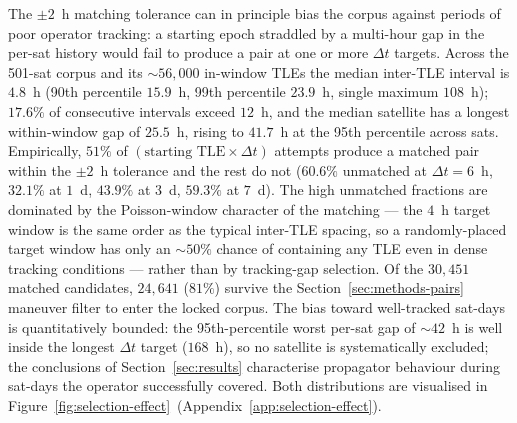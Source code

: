 \documentclass[10pt, letterpaper]{article}
\begin{document}
The $\pm 2$~h matching tolerance can in principle bias the corpus
against periods of poor operator tracking: a starting epoch
straddled by a multi-hour gap in the per-sat history would fail
to produce a pair at one or more $\Delta t$ targets. Across the
501-sat corpus and its $\sim 56{,}000$ in-window TLEs the median
inter-TLE interval is $4.8$~h (90th percentile $15.9$~h, 99th
percentile $23.9$~h, single maximum $108$~h); $17.6\%$ of
consecutive intervals exceed $12$~h, and the median satellite has
a longest within-window gap of $25.5$~h, rising to $41.7$~h at
the 95th percentile across sats. Empirically, $51\%$
of $(\text{starting~TLE} \times \Delta t)$ attempts produce a
matched pair within the $\pm 2$~h tolerance and the rest do not
($60.6\%$ unmatched at $\Delta t = 6$~h, $32.1\%$ at $1$~d,
$43.9\%$ at $3$~d, $59.3\%$ at $7$~d). The high unmatched
fractions are dominated by the Poisson-window character of the
matching --- the $4$~h target window is the same order as the
typical inter-TLE spacing, so a randomly-placed target window has
only an $\sim 50\%$ chance of containing any TLE even in dense
tracking conditions --- rather than by tracking-gap selection.
Of the $30{,}451$ matched candidates, $24{,}641$ ($81\%$) survive
the Section~\ref{sec:methods-pairs} maneuver filter to enter the
locked corpus.
The bias toward well-tracked sat-days is quantitatively bounded:
the 95th-percentile worst per-sat gap of $\sim 42$~h is well
inside the longest $\Delta t$ target ($168$~h), so no satellite is
systematically excluded; the conclusions of
Section~\ref{sec:results} characterise propagator behaviour during
sat-days the operator successfully covered. Both distributions are
visualised in
Figure~\ref{fig:selection-effect}~(Appendix~\ref{app:selection-effect}).
\end{document}
